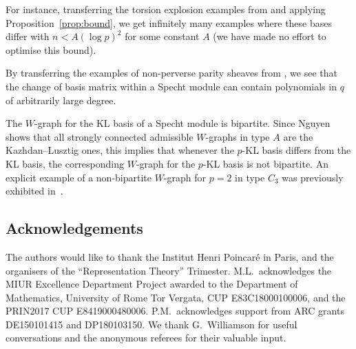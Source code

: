 \documentclass[10pt,a4paper]{amsart}
\numberwithin{equation}{section}
\begin{document}
For instance, transferring the torsion explosion examples from \cite{explosion} and applying Proposition~\ref{prop:bound}, we get infinitely many examples where these bases differ with $n<A(\log p)^2$ for some constant $A$ (we have made no effort to optimise this bound).

By transferring the examples of non-perverse parity sheaves from \cite{parity}, we see that the change of basis matrix within a Specht module can contain polynomials in $q$ of arbitrarily large degree.

The $W$-graph for the KL basis of a Specht module is bipartite. Since
Nguyen \cite[Theorem~9.8]{nguyen} shows that all strongly connected admissible $W$-graphs in type $A$ are the Kazhdan--Lusztig ones, this implies that whenever the $p$-KL basis differs from the KL basis, the corresponding $W$-graph for the $p$-KL basis is not bipartite. An explicit example of a non-bipartite $W$-graph for $p=2$ in type $C_3$ was previously exhibited in~\cite{thorge}.

\subsection*{Acknowledgements}
The authors would like to thank the Institut Henri Poincar\'e in Paris, and the organisers of the ``Representation Theory'' Trimester. M.L.~acknowledges the MIUR Excellence Department Project awarded to the Department of Mathematics, University of Rome Tor Vergata, CUP E83C18000100006, and the PRIN2017 CUP E8419000480006. P.M.~acknowledges support from ARC grants DE150101415 and DP180103150.
We thank G.~Williamson for useful conversations and the anonymous referees for their valuable input.

\end{document}
